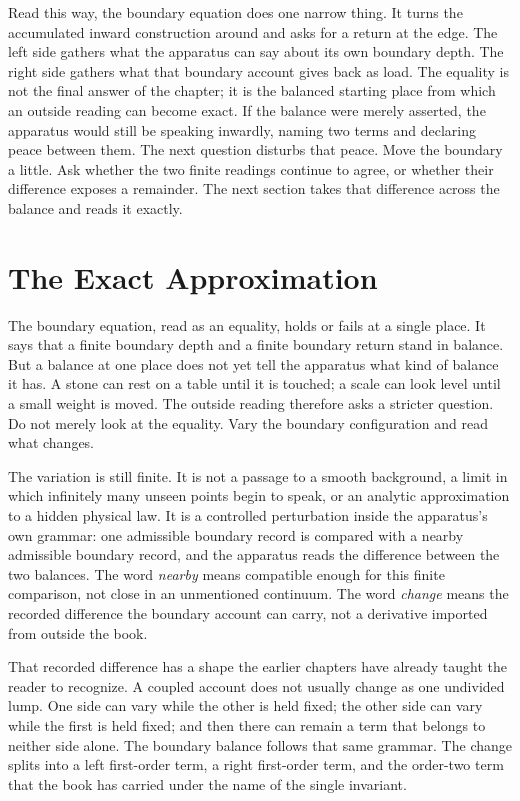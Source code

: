 Read this way, the boundary equation does one narrow thing. It turns the accumulated inward
construction around and asks for a return at the edge. The left side gathers what the apparatus
can say about its own boundary depth. The right side gathers what that boundary account gives
back as load. The equality is not the final answer of the chapter; it is the balanced starting
place from which an outside reading can become exact. If the balance were merely asserted, the
apparatus would still be speaking inwardly, naming two terms and declaring peace between them.
The next question disturbs that peace. Move the boundary a little. Ask whether the two finite
readings continue to agree, or whether their difference exposes a remainder. The next section
takes that difference across the balance and reads it exactly.

\section{The Exact Approximation}

The boundary equation, read as an equality, holds or fails at a single place. It says that a
finite boundary depth and a finite boundary return stand in balance. But a balance at one place
does not yet tell the apparatus what kind of balance it has. A stone can rest on a table until it
is touched; a scale can look level until a small weight is moved. The outside reading therefore
asks a stricter question. Do not merely look at the equality. Vary the boundary configuration and
read what changes.

The variation is still finite. It is not a passage to a smooth background, a limit in which
infinitely many unseen points begin to speak, or an analytic approximation to a hidden physical
law. It is a controlled perturbation inside the apparatus's own grammar: one admissible boundary
record is compared with a nearby admissible boundary record, and the apparatus reads the
difference between the two balances. The word \emph{nearby} means compatible enough for this
finite comparison, not close in an unmentioned continuum. The word \emph{change} means the
recorded difference the boundary account can carry, not a derivative imported from outside the
book.

That recorded difference has a shape the earlier chapters have already taught the reader to
recognize. A coupled account does not usually change as one undivided lump. One side can vary
while the other is held fixed; the other side can vary while the first is held fixed; and then
there can remain a term that belongs to neither side alone. The boundary balance follows that
same grammar. The change splits into a left first-order term, a right first-order term, and the
order-two term that the book has carried under the name of the single invariant.

